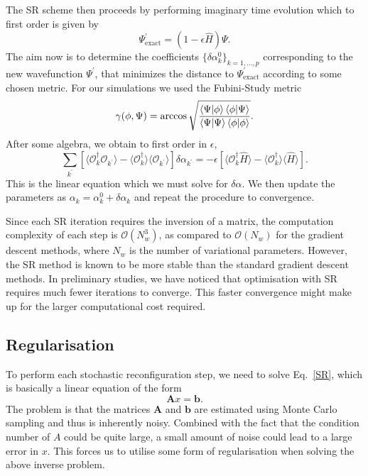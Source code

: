 \documentclass[aps,prl,twocolumn,amsmath,amssymb,superscriptaddress,floatfix]{revtex4-1}
\begin{document}
\begin{widetext}
The SR scheme then proceeds by performing imaginary time evolution which to first order is given by
\begin{equation} \label{eqn: exp}
\Psi^{\prime}_{\mathrm{exact}} = (1 - \epsilon \hat{H}) \Psi.
\end{equation}
The aim now is to determine the coefficients $\lbrace \delta \alpha^{0}_{k} \rbrace_{k=1, \dots, p}$ corresponding to the new wavefunction $\Psi^{\prime}$, that minimizes the distance to $\Psi^{\prime}_{\mathrm{exact}}$ according to some chosen metric. For our simulations we used the Fubini-Study metric
\begin{equation}
\gamma(\phi, \Psi) = \arccos{\sqrt{\frac{\braket{\Psi|\phi} \braket{\phi|\Psi}}{\braket{\Psi|\Psi}\braket{\phi|\phi}}}}.
\end{equation}
After some algebra, we obtain to first order in $\epsilon$,
\begin{equation}\label{SR}
\sum_{k^{\prime}} \left[ \langle \mathcal{O}_{k}^{\dagger} \mathcal{O}_{k^{\prime}} \rangle -  \langle\mathcal{O}_{k}^{\dagger}\rangle \langle\mathcal{O}_{k^{\prime}}\rangle\right]\delta\alpha_{k^{\prime}} = -\epsilon \left[ \langle\mathcal{O}_{k}^{\dagger} \hat{H}\rangle -  \langle\mathcal{O}_{k}^{\dagger}\rangle \langle\hat{H}\rangle \right].
\end{equation}
This is the linear equation which we must solve for $\delta \alpha$. We then update the parameters as $\alpha_{k} = \alpha^{0}_{k} + \delta \alpha_{k}$ and repeat the procedure to convergence.

Since each SR iteration requires the inversion of a matrix, the computation complexity of each step is $\mathcal{O}(N_{w}^{3})$, as compared to $\mathcal{O}(N_{w})$ for the gradient descent methods, where $N_{w}$ is the number of variational parameters. However, the SR method is known to be more stable than the standard gradient descent methods. In preliminary studies, we have noticed that optimisation with SR requires much fewer iterations to converge. This faster convergence might make up for the larger computational cost required.


\subsection{Regularisation}
To perform each stochastic reconfiguration step, we need to solve Eq.~\eqref{SR}, which is basically a linear equation of the form
\begin{equation}
\boldsymbol{A} x = \boldsymbol{b}.
\end{equation}
The problem is that the matrices $\boldsymbol{A}$ and $\boldsymbol{b}$ are estimated using Monte Carlo sampling and thus is inherently noisy. Combined with the fact that the condition number of $A$ could be quite large, a small amount of noise could lead to a large error in $x$. This forces us to utilise some form of regularisation when solving the above inverse problem.


\end{widetext}
\end{document}
